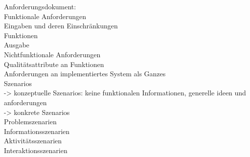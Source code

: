 Anforderungsdokument:\\
Funktionale Anforderungen\\
Eingaben und deren Einschränkungen\\
Funktionen\\
Ausgabe\\

Nichtfunktionale Anforderungen\\
Qualitätsattribute an Funktionen\\
Anforderungen an implementiertes System als Ganzes\\


Szenarios\\
-> konzeptuelle Szenarios: keine funktionalen Informationen, generelle ideen und anforderungen\\
-> konkrete Szenarios\\
Problemszenarien\\
Informationsszenarien\\
Aktivitätsszenarien\\
Interaktionsszenarien






